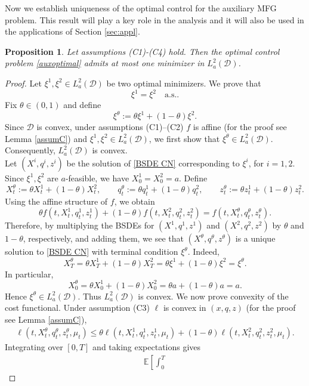 \documentclass[11pt,a4paper]{article}
\newtheorem{prop}[theo]{Proposition}
\begin{document}
Now we  establish uniqueness of the optimal control for the auxiliary MFG problem. This result will play a key role in the analysis and it will also be used in the applications of Section \ref{sec:appl}.
\begin{prop}
\label{uniquexi}
Let assumptions (C1)-(C4) hold. Then the optimal control problem \eqref{auxoptimal} admits at most one minimizer in $L^2_a(\mathcal D)$.
\end{prop}
\begin{proof}
Let $\xi^1,\xi^2\in L^2_a(\mathcal D)$ be two optimal minimizers. We prove that 
\[\xi^1=\xi^2 \quad \text{a.s.}.\] 
Fix $\theta\in(0,1)$ and define
\[
\xi^\theta:=\theta \xi^1+(1-\theta)\xi^2.
\]
Since $\mathcal D$ is convex, under assumptions \textnormal{(C1)--(C2)} $f$ is affine (for the proof see Lemma \ref{assumC}) and $\xi^1,\xi^2\in L^2_a(\mathcal D)$, we first show that $\xi^\theta\in L_a^2(\mathcal D)$. Consequently, $L_a^2(\mathcal D)$ is convex.\\
Let $(X^i,q^i,z^i)$ be the solution of \eqref{BSDE CN} corresponding to
$\xi^i$, for $i=1,2$. Since $\xi^1,\xi^2$ are $a$-feasible, we have
$X_0^1=X_0^2=a$. Define
\[
X_t^\theta:=\theta X_t^1+(1-\theta)X_t^2,
\qquad
q_t^\theta:=\theta q_t^1+(1-\theta)q_t^2,
\qquad
z_t^\theta:=\theta z_t^1+(1-\theta)z_t^2.
\]
Using the affine structure of $f$, we obtain
\[
\theta f(t,X_t^1,q_t^1,z_t^1)
+(1-\theta)f(t,X_t^2,q_t^2,z_t^2)=
f(t, X_t^\theta, q_t^\theta, z_t^\theta).
\]
Therefore, by multiplying the BSDEs for $(X^1,q^1,z^1)$ and
$(X^2,q^2,z^2)$ by $\theta$ and $1-\theta$, respectively, and adding them, we see that $( X^\theta, q^\theta, z^\theta)$ is a unique solution to  \eqref{BSDE CN} with terminal condition $\xi^\theta$. Indeed,
\[
X_T^\theta=\theta X_T^1+(1-\theta)X_T^2= \theta \xi^1+(1-\theta)\xi^2
=\xi^\theta.
\]
In particular,
\[
X_0^\theta= \theta X_0^1+(1-\theta)X_0^2=\theta a+(1-\theta)a=a.
\]
Hence $\xi^\theta\in L^2_a(\mathcal D)$. Thus $L^2_a(\mathcal D)$ is convex.
We now prove convexity of the cost functional. Under assumption (C3)
$\ell$  is convex in $(x,q,z)$ (for the proof see Lemma \ref{assumC}),
\[
\begin{aligned}
\ell(t,X_t^\theta,q_t^\theta,z_t^\theta,\mu_t) 
\leq \theta \ell(t,X_t^1,q_t^1,z_t^1,\mu_t) +(1-\theta)\ell(t,X_t^2,q_t^2,z_t^2,\mu_t).
\end{aligned}
\]
Integrating over $[0,T]$ and taking expectations gives
\begin{equation}
\label{lconvex}
    \begin{aligned}
\mathbb E\left[\int_0^T

\end{aligned}
\end{equation}
\end{proof}
\end{document}

